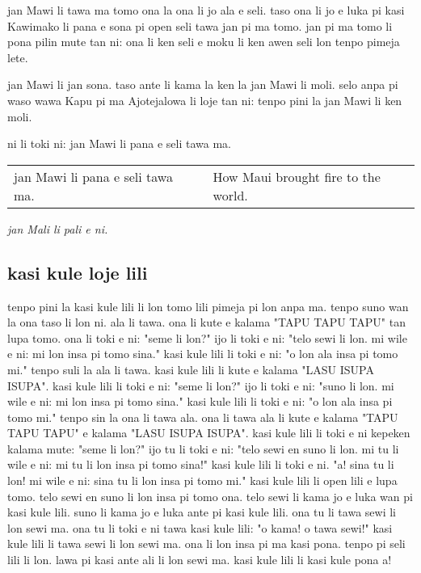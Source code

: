jan Mawi li tawa ma tomo ona la ona li jo ala e seli.
taso ona li jo e luka pi kasi Kawimako li pana e sona pi open seli tawa jan pi ma tomo.
jan pi ma tomo li pona pilin mute tan ni: ona li ken seli e moku li ken awen seli lon tenpo pimeja lete.

jan Mawi li jan sona.
taso ante li kama la ken la jan Mawi li moli.
selo anpa pi waso wawa Kapu pi ma Ajotejalowa li loje tan ni: tenpo pini la jan Mawi li ken moli.

ni li toki ni: jan Mawi li pana e seli tawa ma.

\begin{supertabular}{p{5,5cm}|ll}
    jan Mawi li pana e seli tawa ma. &  & How Maui brought fire to the world. \\
\end{supertabular}

\textit{jan Mali li pali e ni. \cite{www:astrodonunt:01}}

\subsection{kasi kule loje lili}
tenpo pini la kasi kule lili li lon tomo lili pimeja pi lon anpa ma.
tenpo suno wan la ona taso li lon ni.
ala li tawa.
ona li kute e kalama "TAPU TAPU TAPU" tan lupa tomo.
ona li toki e ni: "seme li lon?"
ijo li toki e ni: "telo sewi li lon.
mi wile e ni: mi lon insa pi tomo sina."
kasi kule lili li toki e ni: "o lon ala insa pi tomo mi."
tenpo suli la ala li tawa.
kasi kule lili li kute e kalama "LASU ISUPA ISUPA".
kasi kule lili li toki e ni: "seme li lon?"
ijo li toki e ni: "suno li lon.
mi wile e ni: mi lon insa pi tomo sina."
kasi kule lili li toki e ni: "o lon ala insa pi tomo mi."
tenpo sin la ona li tawa ala.
ona li tawa ala li kute e kalama "TAPU TAPU TAPU" e kalama "LASU ISUPA ISUPA".
kasi kule lili li toki e ni kepeken kalama mute: "seme li lon?"
ijo tu li toki e ni: "telo sewi en suno li lon.
mi tu li wile e ni: mi tu li lon insa pi tomo sina!"
kasi kule lili li toki e ni.
"a!
sina tu li lon!
mi wile e ni: sina tu li lon insa pi tomo mi."
kasi kule lili li open lili e lupa tomo.
telo sewi en suno li lon insa pi tomo ona.
telo sewi li kama jo e luka wan pi kasi kule lili.
suno li kama jo e luka ante pi kasi kule lili.
ona tu li tawa sewi li lon sewi ma.
ona tu li toki e ni tawa kasi kule lili: "o kama!
o tawa sewi!"
kasi kule lili li tawa sewi li lon sewi ma.
ona li lon insa pi ma kasi pona.
tenpo pi seli lili li lon.
lawa pi kasi ante ali li lon sewi ma.
kasi kule lili li kasi kule pona a!

